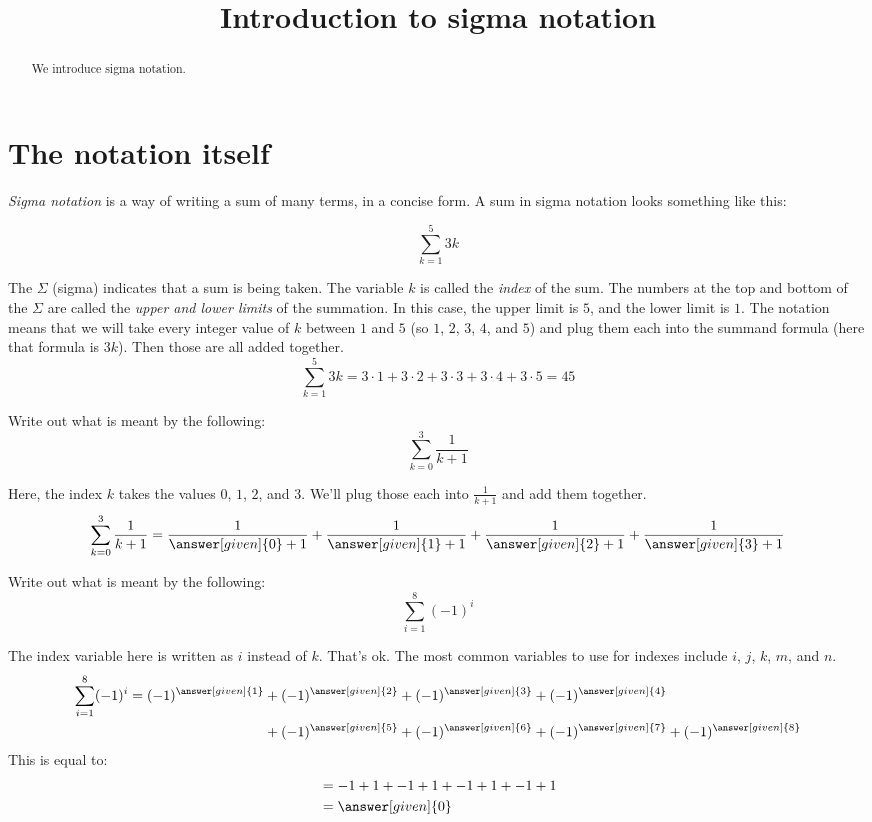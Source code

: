 \documentclass[12pt]{ximera}
\title[Dig-In:]{Introduction to sigma notation}
\author{}
\begin{document}
\begin{abstract}
  We introduce sigma notation.
\end{abstract}
\maketitle

\section{The notation itself}
\emph{Sigma notation} is a way of writing a sum of many terms, in a concise form.  A sum in sigma notation looks something like this:

\[ \sum_{k=1}^{5} 3k \]

The $\Sigma$ (sigma) indicates that a sum is being taken.  The variable $k$ is called the \emph{index} of the sum.  The numbers at the top and bottom of the $\Sigma$
are called the \emph{upper and lower limits} of the summation.  In this case, the upper limit is $5$, and the lower limit is $1$.  The notation means that we will take
every integer value of $k$ between $1$ and $5$ (so $1$, $2$, $3$, $4$, and $5$) and plug them each into the summand formula (here that formula is $3k$).
Then those are all added together.
\[ \sum_{k=1}^{5} 3k= 3\cdot 1 + 3\cdot 2 + 3\cdot 3 + 3\cdot 4 + 3\cdot 5 = 45 \]



\begin{example}
  Write out what is meant by the following:
  \[
  \sum_{k=0}^{3} \frac{1}{k+1}
  \]
  \begin{explanation}
    Here, the index $k$ takes the values $0$, $1$, $2$, and $3$.  We'll plug those each into $\frac{1}{k+1}$ and add them together.
    \[
    \sum_{k=0}^3 \frac{1}{k+1} = \frac{1}{\answer[given]{0}+1} + \frac{1}{\answer[given]{1}+1} + \frac{1}{\answer[given]{2}+1} + \frac{1}{\answer[given]{3}+1}
    \]
  \end{explanation}
\end{example}




\begin{example}
  Write out what is meant by the following:
  \[
  \sum_{i=1}^{8} \left(-1\right)^i
  \]
  \begin{explanation}
    The index variable here is written as $i$ instead of $k$.  That's ok.  The most common variables to use for indexes include $i$, $j$, $k$, $m$, and $n$.
    \begin{align*}
      \sum_{i=1}^8 (-1)^i = (-1)^{\answer[given]{1}} &+ (-1)^{\answer[given]{2}} + (-1)^{\answer[given]{3}} + (-1)^{\answer[given]{4}} \\
      &+ (-1)^{\answer[given]{5} }+ (-1)^{\answer[given]{6}} + (-1)^{\answer[given]{7}} + (-1)^{\answer[given]{8}}
    \end{align*}
    This is equal to:
    \begin{align*}
      &= -1 + 1 + -1 + 1 + -1 + 1 + -1 + 1\\
      &= \answer[given]{0}
    \end{align*}	
  \end{explanation}
\end{example}
\end{document}
